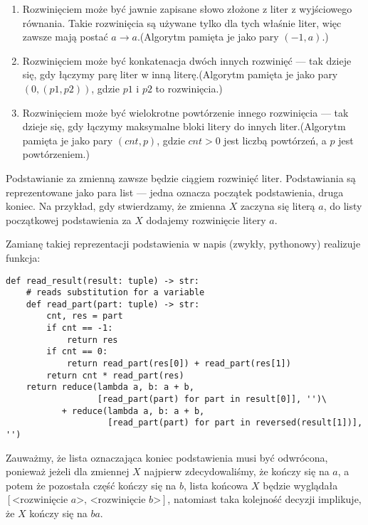 \documentclass[leqno, 12pt]{article}
\begin{document}
\begin{enumerate}
	\item Rozwinięciem może być jawnie zapisane słowo złożone z liter z wyjściowego równania. Takie rozwinięcia są używane tylko dla tych właśnie liter, więc zawsze mają postać $a \rightarrow a$.\newline (Algorytm pamięta je jako pary $(-1, a)$.)

	\item Rozwinięciem może być konkatenacja dwóch innych rozwinięć --- tak dzieje się, gdy łączymy parę liter w inną literę.\newline (Algorytm pamięta je jako pary $(0, (p1, p2))$, gdzie $p1$ i $p2$ to rozwinięcia.)

	\item Rozwinięciem może być wielokrotne powtórzenie innego rozwinięcia --- tak dzieje się, gdy łączymy maksymalne bloki litery do innych liter.\newline (Algorytm pamięta je jako pary $(cnt, p)$, gdzie $cnt > 0$ jest liczbą powtórzeń, a $p$ jest powtórzeniem.)

\end{enumerate}


Podstawianie za zmienną zawsze będzie ciągiem rozwinięć liter. Podstawiania są reprezentowane jako para list --- jedna oznacza początek podstawienia, druga koniec. Na przykład, gdy stwierdzamy, że zmienna $X$ zaczyna się literą $a$, do listy początkowej podstawienia za $X$ dodajemy rozwinięcie litery $a$.

Zamianę takiej reprezentacji podstawienia w napis (zwykły, pythonowy) realizuje funkcja:
\begin{verbatim}
def read_result(result: tuple) -> str:
    # reads substitution for a variable
    def read_part(part: tuple) -> str:
        cnt, res = part
        if cnt == -1:
            return res
        if cnt == 0:
            return read_part(res[0]) + read_part(res[1])
        return cnt * read_part(res)
    return reduce(lambda a, b: a + b,
                  [read_part(part) for part in result[0]], '')\
           + reduce(lambda a, b: a + b,
                    [read_part(part) for part in reversed(result[1])], '')
\end{verbatim}
Zauważmy, że lista oznaczająca koniec podstawienia musi być odwrócona, ponieważ jeżeli dla zmiennej $X$ najpierw zdecydowaliśmy, że kończy się na $a$, a potem że pozostała część kończy się na $b$, lista końcowa $X$ będzie wyglądała \newline$[\text{<rozwinięcie }a\text{>, <rozwinięcie }b\text{>}]$, natomiast taka kolejność decyzji implikuje, że $X$ kończy się na $ba$.
\end{document}

